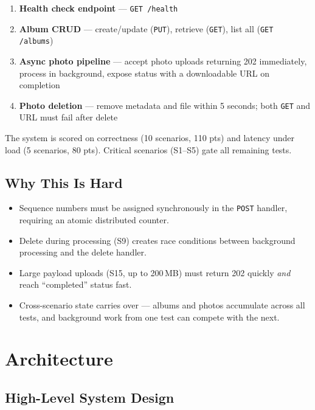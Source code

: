 \documentclass[11pt]{article}
\begin{document}
\begin{enumerate}
    \item \textbf{Health check endpoint} --- \texttt{GET /health}
    \item \textbf{Album CRUD} --- create/update (\texttt{PUT}), retrieve (\texttt{GET}), list all (\texttt{GET /albums})
    \item \textbf{Async photo pipeline} --- accept photo uploads returning 202 immediately, process in background, expose status with a downloadable URL on completion
    \item \textbf{Photo deletion} --- remove metadata and file within 5 seconds; both \texttt{GET} and URL must fail after delete
\end{enumerate}

The system is scored on correctness (10 scenarios, 110 pts) and latency under load (5 scenarios, 80 pts). Critical scenarios (S1--S5) gate all remaining tests.

\subsection{Why This Is Hard}

\begin{itemize}
    \item Sequence numbers must be assigned synchronously in the \texttt{POST} handler, requiring an atomic distributed counter.
    \item Delete during processing (S9) creates race conditions between background processing and the delete handler.
    \item Large payload uploads (S15, up to 200\,MB) must return 202 quickly \emph{and} reach ``completed'' status fast.
    \item Cross-scenario state carries over --- albums and photos accumulate across all tests, and background work from one test can compete with the next.
\end{itemize}

\section{Architecture}

\subsection{High-Level System Design}
\end{document}
